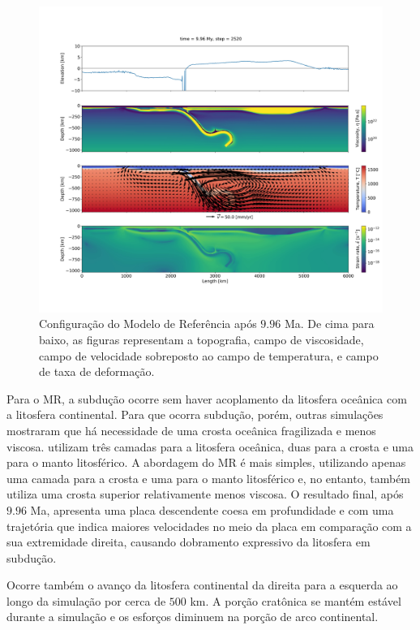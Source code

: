 \begin{figure}
    \centering
    \includegraphics[trim={5cm 14cm 2cm 12cm}, clip, width=1.0 \textwidth]{fig/strak_32-11.png}
    \caption{Configuração do Modelo de Referência após $9.96$ Ma. De cima para baixo, as figuras representam a topografia, campo de viscosidade, campo de velocidade sobreposto ao campo de temperatura, e campo de taxa de deformação.}
    \label{fig:strak_32-11}
\end{figure}

Para o MR, a subdução ocorre sem haver acoplamento da litosfera oceânica com a litosfera continental. Para que ocorra subdução, porém, outras simulações mostraram que há necessidade de uma crosta oceânica fragilizada e menos viscosa. \citet{strak2021thermo} utilizam três camadas para a litosfera oceânica, duas para a crosta e uma para o manto litosférico. A abordagem do MR é mais simples, utilizando apenas uma camada para a crosta e uma para o manto litosférico e, no entanto, também utiliza uma crosta superior relativamente menos viscosa. O resultado final, após $9.96$ Ma, apresenta uma placa descendente coesa em profundidade e com uma trajetória que indica maiores velocidades no meio da placa em comparação com a sua extremidade direita, causando dobramento expressivo da litosfera em subdução.

Ocorre também o avanço da litosfera continental da direita para a esquerda ao longo da simulação por cerca de $500$ km. A porção cratônica se mantém estável durante a simulação e os esforços diminuem na porção de arco continental.

